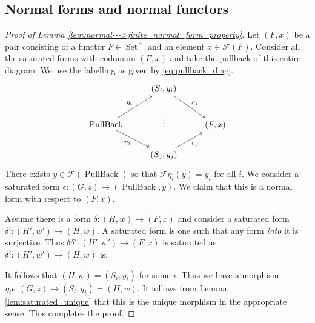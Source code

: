 \documentclass[12pt]{article}
\theoremstyle{plain}
\theoremstyle{definition}
\newcommand{\scr}[1]{\mathscr{#1}}
\newcommand{\lto}{\longrightarrow}
\DeclareMathOperator{\set}{Set}
\begin{document}
\subsection{Normal forms and normal functors}
\begin{proof}[Proof of Lemma \ref{lem:normal--->finite_normal_form_property}]
		Let $(F,x)$ be a pair consisting of a functor $F \in \set^A$ and an element $x \in \scr{F}(F)$. Consider all the saturated forms with codomain $(F,x)$ and take the pullback of this entire diagram. We use the labelling as given by \eqref{eq:pullback_diag}.
		\begin{equation}\label{eq:pullback_diag}
			\begin{tikzcd}
				& (S_i, y_i)\arrow[dr,"{\sigma_i}"]\\
				\operatorname{PullBack}\arrow[ur,"{\eta_i}"]\arrow[dr,swap,"{\eta_j}"] & \vdots & (F,x)\\
				 & (S_j, y_j)\arrow[ur,swap,"{\sigma_j}"]
				\end{tikzcd}
			\end{equation}
		There exists $y \in \scr{F}(\operatorname{PullBack})$ so that $\scr{F}\eta_i(y) = y_i$ for all $i$. We consider a saturated form $\epsilon: (G, z) \lto (\operatorname{PullBack}, y)$. We claim that this is a normal form with respect to $(F,x)$.
		
		Assume there is a form $\delta: (H, w) \lto (F,x)$ and consider a saturated form $\delta': (H', w') \lto (H, w)$. A saturated form is one such that any form \emph{into} it is surjective. Thus $\delta \delta': (H', w')\lto (F,x)$ is saturated as $\delta': (H', w') \lto (H,w)$ is.
		
		It follows that $(H,w) = (S_i, y_i)$ for some $i$. Thus we have a morphism $\eta_i \epsilon: (G, z) \lto (S_i, y_i) = (H,w)$. It follows from Lemma \ref{lem:saturated_unique} that this is the unique morphism in the appropriate sense. This completes the proof.
		\end{proof}
\end{document}
